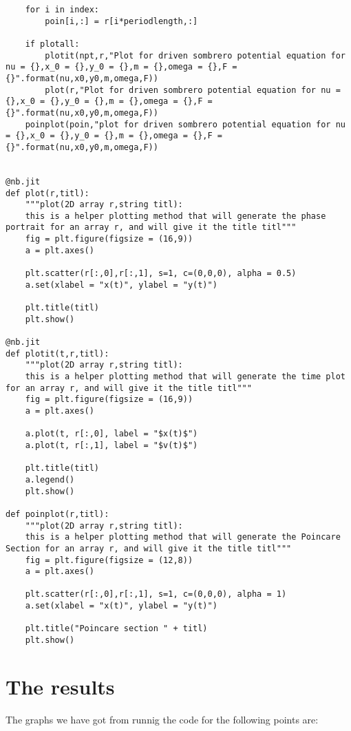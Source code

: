 \documentclass[aps,pra,notitlepage,amsmath,amssymb,letterpaper,12pt]{revtex4-1}
\theoremstyle{definition}
\begin{document}
\begin{lstlisting}
    for i in index:
        poin[i,:] = r[i*periodlength,:]
    
    if plotall:
        plotit(npt,r,"Plot for driven sombrero potential equation for nu = {},x_0 = {},y_0 = {},m = {},omega = {},F = {}".format(nu,x0,y0,m,omega,F))
        plot(r,"Plot for driven sombrero potential equation for nu = {},x_0 = {},y_0 = {},m = {},omega = {},F = {}".format(nu,x0,y0,m,omega,F))
    poinplot(poin,"plot for driven sombrero potential equation for nu = {},x_0 = {},y_0 = {},m = {},omega = {},F = {}".format(nu,x0,y0,m,omega,F))

    
@nb.jit
def plot(r,titl):
    """plot(2D array r,string titl):
    this is a helper plotting method that will generate the phase portrait for an array r, and will give it the title titl"""
    fig = plt.figure(figsize = (16,9))
    a = plt.axes()
    
    plt.scatter(r[:,0],r[:,1], s=1, c=(0,0,0), alpha = 0.5)
    a.set(xlabel = "x(t)", ylabel = "y(t)")
    
    plt.title(titl)
    plt.show()
    
@nb.jit
def plotit(t,r,titl):
    """plot(2D array r,string titl):
    this is a helper plotting method that will generate the time plot for an array r, and will give it the title titl"""
    fig = plt.figure(figsize = (16,9))
    a = plt.axes()
 
    a.plot(t, r[:,0], label = "$x(t)$")
    a.plot(t, r[:,1], label = "$v(t)$")
    
    plt.title(titl)
    a.legend()
    plt.show()
    
def poinplot(r,titl):
    """plot(2D array r,string titl):
    this is a helper plotting method that will generate the Poincare Section for an array r, and will give it the title titl"""
    fig = plt.figure(figsize = (12,8))
    a = plt.axes()
    
    plt.scatter(r[:,0],r[:,1], s=1, c=(0,0,0), alpha = 1)
    a.set(xlabel = "x(t)", ylabel = "y(t)")
    
    plt.title("Poincare section " + titl)
    plt.show()

\end{lstlisting}

\section{The results}

The graphs we have got from runnig the code for the following points are:
\end{document}
